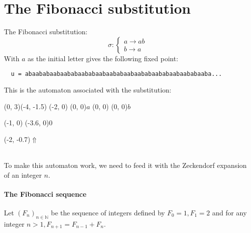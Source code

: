 \documentclass{article}
\begin{document}
\newcommand{\qed}{$\blacksquare$}

\section*{}

\section*{The Fibonacci substitution}
The Fibonacci substitution:
\begin{displaymath}
\sigma: \left\{ \begin{array}{l}
a \rightarrow ab\\
b \rightarrow a
\end{array} \right.
\end{displaymath}
With $a$ as the initial letter gives the following fixed point:
\begin{verbatim}
  u = abaababaabaababaababaabaababaabaababaababaabaababaaba...
\end{verbatim}
This is the automaton associated with the substitution:\\
\begin{graph}(0, 3)(-4, -1.5)
  (-2, 0) (0, 0){$a$}
  (0, 0)  (0, 0){$b$}

  (-1, 0) \freetext(-3.6, 0){0}
   
   

  \freetext(-2, -0.7){$\Uparrow$}
\end{graph}\\
To make this automaton work, we need to feed it with the Zeckendorf expansion
of an integer $n$.\\
\paragraph{The Fibonacci sequence}
Let $(F_n)_{n \in \mathbb{N}}$ be the sequence of integers defined by $F_0 = 1,
F_1 = 2$ and for any integer $n > 1, F_{n + 1} = F_{n - 1} + F_n$.\\
\end{document}
